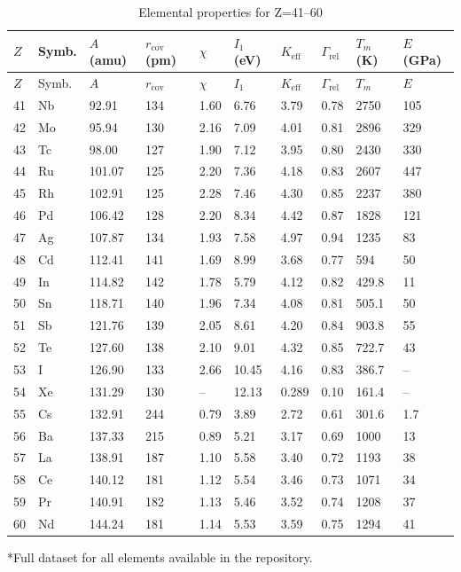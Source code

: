 \documentclass[12pt,a4paper]{article}
\newcommand{\Keff}{K_{\mathrm{eff}}}
\begin{document}
	\begin{longtable}{p{0.6cm}p{1.2cm}p{1.2cm}p{1.2cm}p{1.2cm}p{1.2cm}p{1.5cm}p{1.2cm}p{1.2cm}p{1.2cm}}
		\caption{Elemental properties for Z=41–60} \label{tab:elem-data-41to60} \\
		\toprule
		\(Z\) & Symb. & \(A\) (amu) & \(r_{\text{cov}}\) (pm) & \(\chi\) & \(I_1\) (eV) & \(\Keff\) & \(\Gamma_{\text{rel}}\) & \(T_m\) (K) & \(E\) (GPa) \\
		\midrule
		\endfirsthead
		\toprule
		\(Z\) & Symb. & \(A\) & \(r_{\text{cov}}\) & \(\chi\) & \(I_1\) & \(\Keff\) & \(\Gamma_{\text{rel}}\) & \(T_m\) & \(E\) \\
		\midrule
		\endhead
		41 & Nb & 92.91 & 134 & 1.60 & 6.76 & 3.79 & 0.78 & 2750 & 105 \\
		42 & Mo & 95.94 & 130 & 2.16 & 7.09 & 4.01 & 0.81 & 2896 & 329 \\
		43 & Tc & 98.00 & 127 & 1.90 & 7.12 & 3.95 & 0.80 & 2430 & 330 \\
		44 & Ru & 101.07 & 125 & 2.20 & 7.36 & 4.18 & 0.83 & 2607 & 447 \\
		45 & Rh & 102.91 & 125 & 2.28 & 7.46 & 4.30 & 0.85 & 2237 & 380 \\
		46 & Pd & 106.42 & 128 & 2.20 & 8.34 & 4.42 & 0.87 & 1828 & 121 \\
		47 & Ag & 107.87 & 134 & 1.93 & 7.58 & 4.97 & 0.94 & 1235 & 83 \\
		48 & Cd & 112.41 & 141 & 1.69 & 8.99 & 3.68 & 0.77 & 594 & 50 \\
		49 & In & 114.82 & 142 & 1.78 & 5.79 & 4.12 & 0.82 & 429.8 & 11 \\
		50 & Sn & 118.71 & 140 & 1.96 & 7.34 & 4.08 & 0.81 & 505.1 & 50 \\
		51 & Sb & 121.76 & 139 & 2.05 & 8.61 & 4.20 & 0.84 & 903.8 & 55 \\
		52 & Te & 127.60 & 138 & 2.10 & 9.01 & 4.32 & 0.85 & 722.7 & 43 \\
		53 & I  & 126.90 & 133 & 2.66 & 10.45 & 4.16 & 0.83 & 386.7 & – \\
		54 & Xe & 131.29 & 130 & –    & 12.13 & 0.289 & 0.10 & 161.4 & – \\
		55 & Cs & 132.91 & 244 & 0.79 & 3.89 & 2.72 & 0.61 & 301.6 & 1.7 \\
		56 & Ba & 137.33 & 215 & 0.89 & 5.21 & 3.17 & 0.69 & 1000 & 13 \\
		57 & La & 138.91 & 187 & 1.10 & 5.58 & 3.40 & 0.72 & 1193 & 38 \\
		58 & Ce & 140.12 & 181 & 1.12 & 5.54 & 3.46 & 0.73 & 1071 & 34 \\
		59 & Pr & 140.91 & 182 & 1.13 & 5.46 & 3.52 & 0.74 & 1208 & 37 \\
		60 & Nd & 144.24 & 181 & 1.14 & 5.53 & 3.59 & 0.75 & 1294 & 41 \\
		\bottomrule
	\end{longtable}
	*Full dataset for all elements available in the repository.
	
\end{document}
